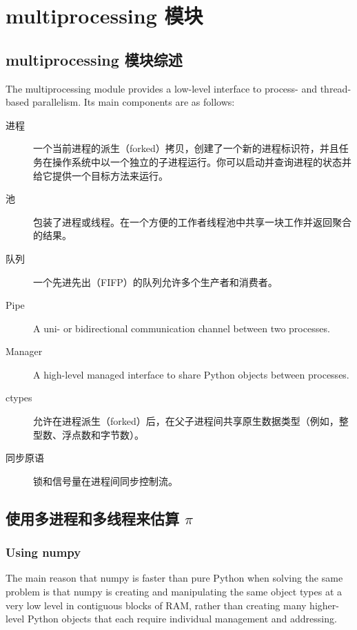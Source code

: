 \chapter{multiprocessing 模块\label{ch09}}
\section{multiprocessing 模块综述}
The multiprocessing module provides a low-level interface to process- and thread-based parallelism. Its main components are as follows:
\begin{description}
    \item[进程]一个当前进程的派生（forked）拷贝，创建了一个新的进程标识符，并且任务在操作系统中以一个独立的子进程运行。你可以启动并查询进程的状态并给它提供一个目标方法来运行。
    \item[池]包装了进程或线程。在一个方便的工作者线程池中共享一块工作并返回聚合的结果。
    \item[队列]一个先进先出（FIFP）的队列允许多个生产者和消费者。
    \item[Pipe]A uni- or bidirectional communication channel between two processes.
    \item[Manager]A high-level managed interface to share Python objects between processes.
    \item[ctypes]允许在进程派生（forked）后，在父子进程间共享原生数据类型（例如，整型数、浮点数和字节数）。
    \item[同步原语]锁和信号量在进程间同步控制流。
\end{description}

\section{使用多进程和多线程来估算 $\pi$}
\subsection{Using numpy}
The main reason that numpy is faster than pure Python when solving the same problem is that numpy is creating and manipulating the same object types at a very low level in contiguous blocks of RAM, rather than creating many higher-level Python objects that each require individual management and addressing.